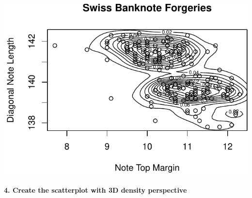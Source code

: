 \documentclass[
]{article}
\newenvironment{Shaded}{\begin{snugshade}}{\end{snugshade}}
\newcommand{\DataTypeTok}[1]{\textcolor[rgb]{0.13,0.29,0.53}{#1}}
\newcommand{\DecValTok}[1]{\textcolor[rgb]{0.00,0.00,0.81}{#1}}
\newcommand{\KeywordTok}[1]{\textcolor[rgb]{0.13,0.29,0.53}{\textbf{#1}}}
\newcommand{\NormalTok}[1]{#1}
\newcommand{\OperatorTok}[1]{\textcolor[rgb]{0.81,0.36,0.00}{\textbf{#1}}}
\newcommand{\StringTok}[1]{\textcolor[rgb]{0.31,0.60,0.02}{#1}}
\begin{document}
\begin{center}\includegraphics{2.0-Multivariate-Visualization-Assignment_files/figure-latex/unnamed-chunk-15-1} \end{center}

\hypertarget{create-the-scatterplot-with-3d-density-perspective}{%
\paragraph{\texorpdfstring{\textbf{4. Create the scatterplot with 3D
density
perspective}}{4. Create the scatterplot with 3D density perspective}}\label{create-the-scatterplot-with-3d-density-perspective}}

\begin{Shaded}
\end{Shaded}
\end{document}
